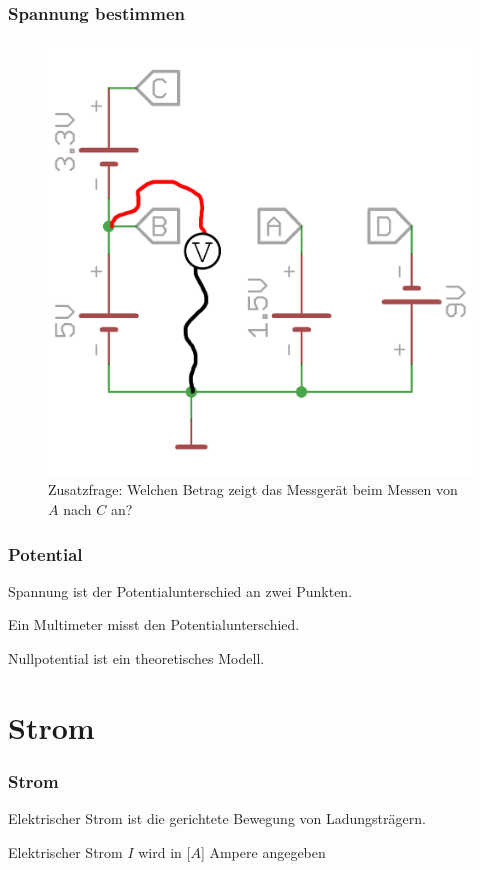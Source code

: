 \begin{frame}
  \frametitle{Spannung bestimmen}
  \begin{center}
    \begin{figure}
      \includegraphics[width=.4\textwidth,height=.75\textheight,keepaspectratio]{e02/SpannungMess.png}
      \caption{Zusatzfrage: Welchen Betrag zeigt das Messgerät beim Messen von $A$ nach $C$ an?}
    \end{figure}
  \end{center}
\end{frame}

\begin{frame}
  \frametitle{Potential}
  \begin{block}{}
    Spannung ist der Potentialunterschied an zwei Punkten.
  \end{block}
  \begin{block}{}
    Ein Multimeter misst den Potentialunterschied.
  \end{block}
  \begin{block}{}
    Nullpotential ist ein theoretisches Modell.
  \end{block}
\end{frame}

\section*{Strom}

\begin{frame}
  \frametitle{Strom}
  \begin{center}
    \begin{block}{}
      Elektrischer Strom ist die gerichtete Bewegung von Ladungsträgern.
    \end{block}
    \begin{block}{}
      Elektrischer Strom $I$ wird in [$A$] Ampere angegeben
    \end{block}
  \end{center}
\end{frame}

